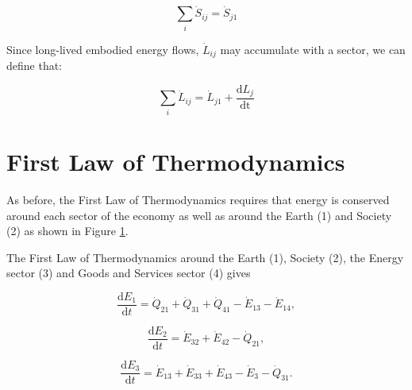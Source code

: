 \begin{equation}\label{eq:D_S_balance}
\sum_{i} \dot{S}_{ij} = \dot{S}_{j1}
\end{equation}

Since long-lived embodied energy flows, $\dot{L}_{ij}$ may accumulate with a sector, we can define that:

\begin{equation}\label{eq:D_L_balance}
\sum_{i} \dot{L}_{ij} = \dot{L}_{j1} + \frac{\textrm{d}L_{j}}{\textrm{dt}}
\end{equation}

%

\section{First Law of Thermodynamics}

As before, the First Law of Thermodynamics requires that energy is conserved around each sector of the economy as well as around the Earth (1) and Society (2) as shown in Figure \ref{}. 

The First Law of Thermodynamics around the Earth (1), Society (2), the Energy sector (3) and Goods and Services sector (4) gives

\begin{equation} \label{eq:D-CV_E_dot_1}
	\frac{\mathrm{d}E_{1}}{\mathrm{d}t} 	 =  \dot{Q}_{21} + \dot{Q}_{31} + \dot{Q}_{41} - \dot{E}_{13} - \dot{E}_{14},
\end{equation}

\begin{equation} \label{eq:D-CV_E_dot_2}
	\frac{\mathrm{d}E_{2}}{\mathrm{d}t} 	 = \dot{E}_{32}  + \dot{E}_{42} - \dot{Q}_{21},
\end{equation}

\begin{equation} \label{eq:D-CV_E_dot_3}
	\frac{\mathrm{d}E_{3}}{\mathrm{d}t} 	 = \dot{E}_{13} + \dot{E}_{33} + \dot{E}_{43} - \dot{E}_{3} - \dot{Q}_{31}.
\end{equation}

